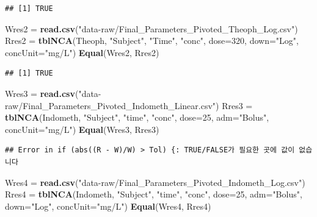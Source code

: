 \documentclass[12pt,]{krantz}
\newenvironment{Shaded}{\begin{snugshade}}{\end{snugshade}}
\newcommand{\DataTypeTok}[1]{\textcolor[rgb]{0.13,0.29,0.53}{#1}}
\newcommand{\DecValTok}[1]{\textcolor[rgb]{0.00,0.00,0.81}{#1}}
\newcommand{\KeywordTok}[1]{\textcolor[rgb]{0.13,0.29,0.53}{\textbf{#1}}}
\newcommand{\NormalTok}[1]{#1}
\newcommand{\StringTok}[1]{\textcolor[rgb]{0.31,0.60,0.02}{#1}}
\begin{document}
\begin{verbatim}
## [1] TRUE
\end{verbatim}

\begin{Shaded}
\begin{Highlighting}[]
\NormalTok{Wres2 =}\StringTok{ }\KeywordTok{read.csv}\NormalTok{(}\StringTok{"data-raw/Final_Parameters_Pivoted_Theoph_Log.csv"}\NormalTok{)}
\NormalTok{Rres2 =}\StringTok{ }\KeywordTok{tblNCA}\NormalTok{(Theoph, }\StringTok{"Subject"}\NormalTok{, }\StringTok{"Time"}\NormalTok{, }\StringTok{"conc"}\NormalTok{, }\DataTypeTok{dose=}\DecValTok{320}\NormalTok{, }\DataTypeTok{down=}\StringTok{"Log"}\NormalTok{, }
               \DataTypeTok{concUnit=}\StringTok{"mg/L"}\NormalTok{)}
\KeywordTok{Equal}\NormalTok{(Wres2, Rres2) }
\end{Highlighting}
\end{Shaded}

\begin{verbatim}
## [1] TRUE
\end{verbatim}

\begin{Shaded}
\begin{Highlighting}[]
\NormalTok{Wres3 =}\StringTok{ }\KeywordTok{read.csv}\NormalTok{(}\StringTok{"data-raw/Final_Parameters_Pivoted_Indometh_Linear.csv"}\NormalTok{)}
\NormalTok{Rres3 =}\StringTok{ }\KeywordTok{tblNCA}\NormalTok{(Indometh, }\StringTok{"Subject"}\NormalTok{, }\StringTok{"time"}\NormalTok{, }\StringTok{"conc"}\NormalTok{, }\DataTypeTok{dose=}\DecValTok{25}\NormalTok{, }\DataTypeTok{adm=}\StringTok{"Bolus"}\NormalTok{, }
               \DataTypeTok{concUnit=}\StringTok{"mg/L"}\NormalTok{)}
\KeywordTok{Equal}\NormalTok{(Wres3, Rres3)}
\end{Highlighting}
\end{Shaded}

\begin{verbatim}
## Error in if (abs((R - W)/W) > Tol) {: TRUE/FALSE가 필요한 곳에 값이 없습니다
\end{verbatim}

\begin{Shaded}
\begin{Highlighting}[]
\NormalTok{Wres4 =}\StringTok{ }\KeywordTok{read.csv}\NormalTok{(}\StringTok{"data-raw/Final_Parameters_Pivoted_Indometh_Log.csv"}\NormalTok{)}
\NormalTok{Rres4 =}\StringTok{ }\KeywordTok{tblNCA}\NormalTok{(Indometh, }\StringTok{"Subject"}\NormalTok{, }\StringTok{"time"}\NormalTok{, }\StringTok{"conc"}\NormalTok{, }\DataTypeTok{dose=}\DecValTok{25}\NormalTok{, }\DataTypeTok{adm=}\StringTok{"Bolus"}\NormalTok{, }
               \DataTypeTok{down=}\StringTok{"Log"}\NormalTok{, }\DataTypeTok{concUnit=}\StringTok{"mg/L"}\NormalTok{)}
\KeywordTok{Equal}\NormalTok{(Wres4, Rres4)}
\end{Highlighting}
\end{Shaded}
\end{document}
